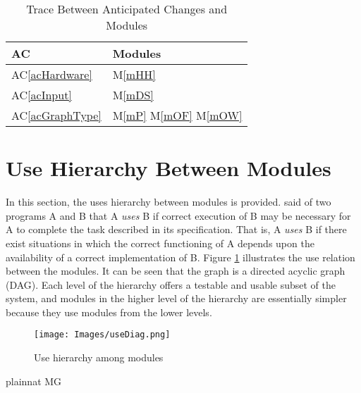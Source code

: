 \documentclass[12pt, titlepage]{article}
\newcommand{\acref}[1]{AC\ref{#1}}
\newcommand{\mref}[1]{M\ref{#1}}
\begin{document}
\begin{table}[H]
\centering
\begin{tabular}{p{} p{}}
\toprule
\textbf{AC} & \textbf{Modules}\\
\midrule
\acref{acHardware} & \mref{mHH}\\
\acref{acInput} & \mref{mDS}\\
\acref{acGraphType} & \mref{mP} \mref{mOF} \mref{mOW}\\
\bottomrule
\end{tabular}
\caption{Trace Between Anticipated Changes and Modules}
\label{TblACT}
\end{table}

\section{Use Hierarchy Between Modules} \label{SecUse}%

In this section, the uses hierarchy between modules is
provided. \citet{Parnas1978} said of two programs A and B that A {\em uses} B if
correct execution of B may be necessary for A to complete the task described in
its specification. That is, A {\em uses} B if there exist situations in which
the correct functioning of A depends upon the availability of a correct
implementation of B.  Figure \ref{FigUH} illustrates the use relation between
the modules. It can be seen that the graph is a directed acyclic graph
(DAG). Each level of the hierarchy offers a testable and usable subset of the
system, and modules in the higher level of the hierarchy are essentially simpler
because they use modules from the lower levels.

\begin{figure}[H]
\centering
\caption{Use hierarchy among modules}
\label{FigUH}
\begin{center}
	\texttt{[image: Images/useDiag.png]}
\end{center}
\end{figure}


 {plainnat}
 {MG}
\end{document}
